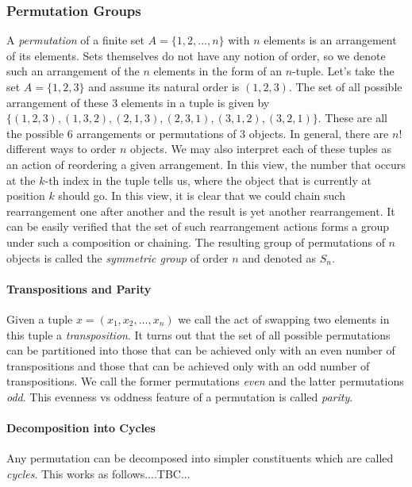 \subsubsection{Permutation Groups}
A \emph{permutation} of a finite set $A = \{ 1,2,\ldots,n \}$ with $n$ elements is an arrangement of its elements. Sets themselves do not have any notion of order, so we denote such an arrangement of the $n$ elements in the form of an $n$-tuple. Let's take the set $A = \{ 1,2,3 \}$ and assume its natural order is $(1,2,3)$. The set of all possible arrangement of these $3$ elements in a tuple is given by $\{ (1,2,3), (1,3,2), (2,1,3), (2,3,1), (3,1,2), (3,2,1) \}$. These are all the possible $6$ arrangements or permutations of $3$ objects. In general, there are $n!$ different ways to order $n$ objects. We may also interpret each of these tuples as an action of reordering a given arrangement. In this view, the number that occurs at the $k$-th index in the tuple tells us, where the object that is currently at position $k$ should go. In this view, it is clear that we could chain such rearrangement one after another and the result is yet another rearrangement. It can be easily verified that the set of such rearrangement actions forms a group under such a composition or chaining. The resulting group of permutations of $n$ objects is called the \emph{symmetric group} of order $n$ and denoted as $S_n$.



\paragraph{Transpositions and Parity}
Given a tuple $x = (x_1, x_2, \ldots, x_n)$ we call the act of swapping two elements in this tuple a \emph{transposition}. It turns out that the set of all possible permutations can be partitioned into those that can be achieved only with an even number of transpositions and those that can be achieved only with an odd number of transpositions. We call the former permutations \emph{even} and the latter permutations \emph{odd}. This evenness vs oddness feature of a permutation is called \emph{parity}.


\paragraph{Decomposition into Cycles}
Any permutation can be decomposed into simpler constituents which are called \emph{cycles}. This works as follows....TBC...

